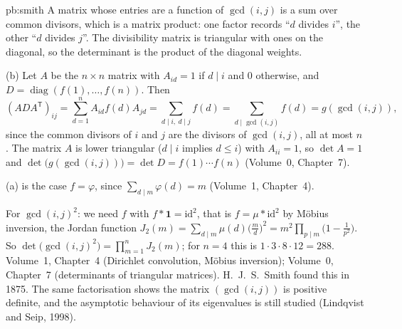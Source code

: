 \begin{solution}{pb:smith}
\idea A matrix whose entries are a function of $\gcd(i,j)$ is a sum over common divisors, which is a matrix product: one
factor records ``$d$ divides $i$'', the other ``$d$ divides $j$''. The divisibility matrix is triangular with ones on the
diagonal, so the determinant is the product of the diagonal weights.

\writeup (b) Let $A$ be the $n\times n$ matrix with $A_{id}=1$ if $d\mid i$ and $0$ otherwise, and $D=\operatorname{diag}
(f(1),\dots,f(n))$. Then
\[
(ADA^{\mathsf T})_{ij}=\sum_{d=1}^nA_{id}f(d)A_{jd}=\sum_{d\mid i,\ d\mid j}f(d)=\sum_{d\mid\gcd(i,j)}f(d)=g(\gcd(i,j)),
\]
since the common divisors of $i$ and $j$ are the divisors of $\gcd(i,j)$, all at most $n$. The matrix $A$ is lower triangular
($d\mid i$ implies $d\le i$) with $A_{ii}=1$, so $\det A=1$ and $\det\bigl(g(\gcd(i,j))\bigr)=\det D=f(1)\cdots f(n)$ (Volume~0,
Chapter~7).

(a) is the case $f=\varphi$, since $\sum_{d\mid m}\varphi(d)=m$ (Volume~1, Chapter~4).

For $\gcd(i,j)^2$: we need $f$ with $f*\mathbf1=\mathrm{id}^2$, that is $f=\mu*\mathrm{id}^2$ by Möbius inversion, the Jordan
function $J_2(m)=\sum_{d\mid m}\mu(d)\bigl(\frac md\bigr)^2=m^2\prod_{p\mid m}\bigl(1-\frac1{p^2}\bigr)$. So
$\det\bigl(\gcd(i,j)^2\bigr)=\prod_{m=1}^nJ_2(m)$; for $n=4$ this is $1\cdot3\cdot8\cdot12=288$.
\tools Volume~1, Chapter~4 (Dirichlet convolution, Möbius inversion); Volume~0, Chapter~7 (determinants of triangular matrices).
\leads H.~J.~S.~Smith found this in 1875. The same factorisation shows the matrix $(\gcd(i,j))$ is positive definite, and
the asymptotic behaviour of its eigenvalues is still studied (Lindqvist and Seip, 1998).
\end{solution}

